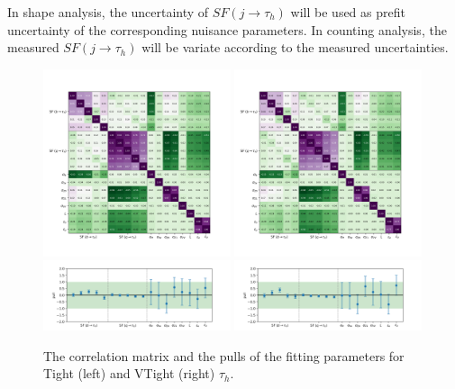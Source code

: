 In shape analysis, the uncertainty of $SF (j \to \tau_h)$ will be used as prefit uncertainty of the corresponding nuisance parameters.  In counting analysis,  the measured $SF (j \to \tau_h)$ will be variate according to the measured uncertainties.




\begin{figure}
    \centering
    \includegraphics[width=0.49\textwidth]{chapters/Analysis/sectionCalibration/figures/jetToTauh/corr2_lltauTight_splitJetFlavor.png}
    \includegraphics[width=0.49\textwidth]{chapters/Analysis/sectionCalibration/figures/jetToTauh/corr2_lltauVTight_splitJetFlavor.png}
    \includegraphics[width=0.49\textwidth]{chapters/Analysis/sectionCalibration/figures/jetToTauh/pull2_lltauTight_splitJetFlavor.png}
    \includegraphics[width=0.49\textwidth]{chapters/Analysis/sectionCalibration/figures/jetToTauh/pull2_lltauVTight_splitJetFlavor.png}
    \caption{The correlation matrix and the pulls of the fitting parameters for Tight (left) and VTight (right) $\tau_h$. }
    \label{fig:appendix:fakeTauId:fitparam}
\end{figure}



